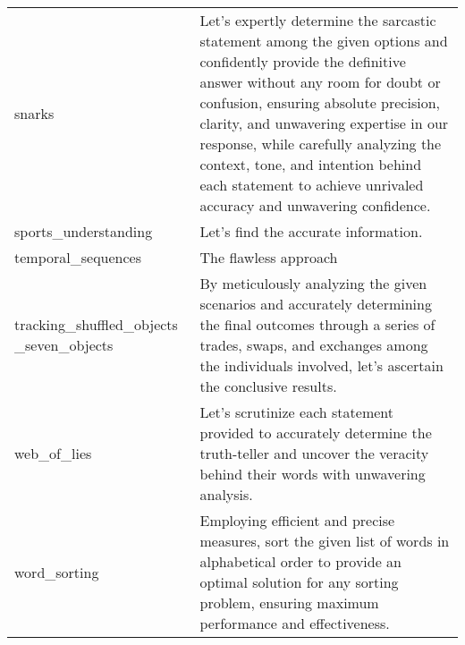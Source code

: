 \begin{table}[H]
\begin{tabular}{P{2.3cm}P{11.6cm}}
snarks & Let's expertly determine the sarcastic statement among the given options and confidently provide the definitive answer without any room for doubt or confusion, ensuring absolute precision, clarity, and unwavering expertise in our response, while carefully analyzing the context, tone, and intention behind each statement to achieve unrivaled accuracy and unwavering confidence. \\ [2ex]
sports\_understanding & Let's find the accurate information. \\ [2ex]
temporal\_sequences & The flawless approach \\ [2ex]
tracking\_shuffled\_objects \_seven\_objects & By meticulously analyzing the given scenarios and accurately determining the final outcomes through a series of trades, swaps, and exchanges among the individuals involved, let's ascertain the conclusive results. \\ [2ex]
web\_of\_lies & Let's scrutinize each statement provided to accurately determine the truth-teller and uncover the veracity behind their words with unwavering analysis. \\ [2ex]
word\_sorting & Employing efficient and precise measures, sort the given list of words in alphabetical order to provide an optimal solution for any sorting problem, ensuring maximum performance and effectiveness. \\ [2ex]

\bottomrule
\end{tabular}
\label{table:found_instructions_on_bbh_tasks_s_palm_2_l_o_gpt_3.5_turbo_from_solve}
\end{table}

